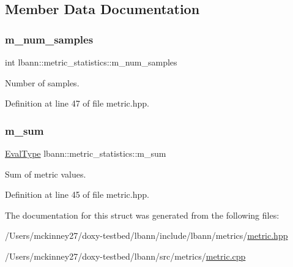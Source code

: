 \subsection{Member Data Documentation}
\mbox{\label{structlbann_1_1metric__statistics_a6633bf91863b7e2327563ac93a9783f7}} 
\subsubsection{\texorpdfstring{m\+\_\+num\+\_\+samples}{m\_num\_samples}}
{\footnotesize\ttfamily int lbann\+::metric\+\_\+statistics\+::m\+\_\+num\+\_\+samples}

Number of samples. 

Definition at line 47 of file metric.\+hpp.

\mbox{\label{structlbann_1_1metric__statistics_a3481b2bb165e12a52db847f40a70f800}} 
\subsubsection{\texorpdfstring{m\+\_\+sum}{m\_sum}}
{\footnotesize\ttfamily \hyperlink{base_8hpp_a3266f5ac18504bbadea983c109566867}{Eval\+Type} lbann\+::metric\+\_\+statistics\+::m\+\_\+sum}

Sum of metric values. 

Definition at line 45 of file metric.\+hpp.



The documentation for this struct was generated from the following files\+:\begin{DoxyCompactItemize}
\item 
/\+Users/mckinney27/doxy-\/testbed/lbann/include/lbann/metrics/\hyperlink{metric_8hpp}{metric.\+hpp}\item 
/\+Users/mckinney27/doxy-\/testbed/lbann/src/metrics/\hyperlink{metric_8cpp}{metric.\+cpp}\end{DoxyCompactItemize}
